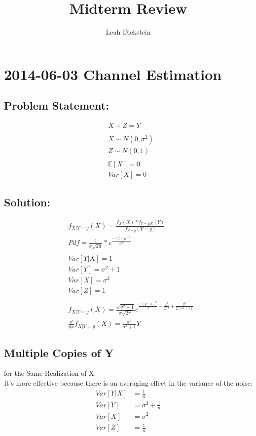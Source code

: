 \documentclass[leqno,twocolumn]{article}
\begin{document}
\onecolumn
\title{Midterm Review}
\author{Leah Dickstein}

\maketitle

\tableofcontents

\twocolumn
\section{2014-06-03 Channel Estimation}
\subsection{Problem Statement:}
\begin{align*}
&X + Z = Y\\
\\
&X \sim N(0,\sigma^2)\\
&Z \sim N(0, 1)\\
\\
&\mathbb{E}[X] = 0\\
&Var[X] = 0
\end{align*}

\subsection{Solution:}
\begin{align*}
&f_{X|Y=y}(X) = \frac{f_X(X)*f_{Y=y|X}(Y)}{f_{Y=y}(Y=y)}\\
&Pdf = \frac{1}{\sigma \sqrt{2\pi}}*e^{\frac{-(x-\mu)^2}{2\sigma^2}}\\
\\
&Var[Y|X] = 1\\
&Var[Y] = \sigma^2 + 1\\
&Var[X] = \sigma^2\\
&Var[Z] = 1\\
\\
&f_{X|Y=y}(X) = \frac{\sqrt{\sigma^2+1}}{\sigma\sqrt{2\pi}}e^{\frac{-(y-x)^2}{2}-\frac{x^2}{2\sigma^2}+\frac{y^2}{2(\sigma^2+1)}}\\
&\frac{d}{dx} f_{X|Y=y}(X) = \frac{\sigma^2}{\sigma^2+1}Y
\end{align*}

\subsection{Multiple Copies of Y}
for the Same Realization of X:\\
It's more effective because there is an averaging effect in the variance of the noise:
\begin{align*}
Var[Y|X] &= \frac{1}{n}\\
Var[Y] &= \sigma^2 + \frac{1}{n}\\
Var[X] &= \sigma^2\\
Var[Z] &= \frac{1}{n}
\end{align*}
\end{document}
